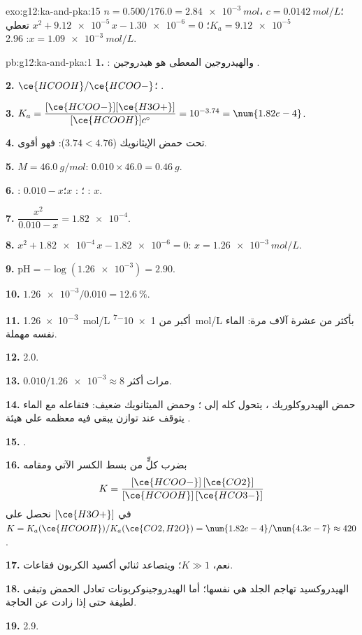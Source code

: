 \begin{solution}{exo:g12:ka-and-pka:15}
$n = 0.500 / 176.0 = \qty{2.84e-3}{mol}$، $c = \qty{0.0142}{mol/L}$؛
$K_a = \num{9.12e-5}$؛ $x^2 + \num{9.12e-5}\,x - \num{1.30e-6} = 0$ تعطي
$x = \qty{1.09e-3}{mol/L}$:  2.96.
\end{solution}

\begin{solution}{pb:g12:ka-and-pka:1}
\textbf{1.} : والهيدروجين المعطى هو هيدروجين .

\textbf{2.} $\ce{HCOOH}/\ce{HCOO-}$؛ .

\textbf{3.} $K_a = \dfrac{[\ce{HCOO-}][\ce{H3O+}]}{[\ce{HCOOH}]c^\circ} =
10^{-3.74} = \num{1.82e-4}$.

\textbf{4.} تحت حمض الإيثانويك ($3.74 < 4.76$): فهو أقوى.

\textbf{5.} $M = \qty{46.0}{g/mol}$: $0.010 \times 46.0 = \qty{0.46}{g}$.

\textbf{6.} : $0.010 - x$؛ : $x$؛ : $x$.

\textbf{7.} $\dfrac{x^2}{0.010 - x} = \num{1.82e-4}$.

\textbf{8.} $x^2 + \num{1.82e-4}\,x - \num{1.82e-6} = 0$:
$x = \qty{1.26e-3}{mol/L}$.

\textbf{9.} $\mathrm{pH} = -\log(\num{1.26e-3}) = 2.90$.

\textbf{10.} $\num{1.26e-3}/0.010 = \qty{12.6}{\percent}$.

\textbf{11.} \qty{1.26e-3}{mol/L} أكبر من \qty{1e-7}{mol/L} بأكثر من عشرة آلاف
مرة:  الماء نفسه مهملة.

\textbf{12.}  2.0.

\textbf{13.} $0.010 / \num{1.26e-3} \approx 8$ مرات أكثر.

\textbf{14.} حمض الهيدروكلوريك ، يتحول كله إلى
؛ وحمض الميثانويك ضعيف: فتفاعله مع الماء يتوقف عند
توازن يبقى فيه معظمه على هيئة .

\textbf{15.} .

\textbf{16.} بضرب كلٍّ من بسط الكسر الآتي ومقامه
\[
  K = \frac{[\ce{HCOO-}]\,[\ce{CO2}]}{[\ce{HCOOH}]\,[\ce{HCO3-}]}
\]
في $[\ce{H3O+}]$ نحصل على $K = K_a(\ce{HCOOH}) / K_a(\ce{CO2,H2O}) =
\num{1.82e-4}/\num{4.3e-7} \approx 420$.

\textbf{17.} نعم، $K \gg 1$؛ ويتصاعد ثنائي أكسيد الكربون فقاعات.

\textbf{18.} الهيدروكسيد  تهاجم الجلد هي نفسها؛
أما الهيدروجينوكربونات  تعادل الحمض وتبقى لطيفة
حتى إذا زادت عن الحاجة.

\textbf{19.}  2.9.
\end{solution}
